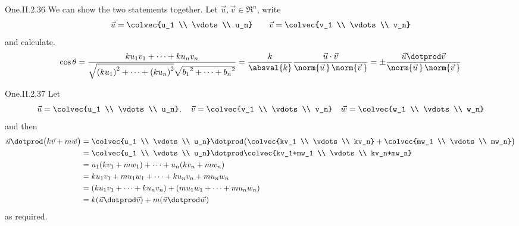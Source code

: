 \begin{ans}{One.II.2.36}
      We can show the two statements together.
      Let \( \vec{u}, \vec{v}\in\Re^n \), write
      \begin{equation*}
         \vec{u}=\colvec{u_1 \\ \vdots \\ u_n}
         \qquad
         \vec{v}=\colvec{v_1 \\ \vdots \\ v_n}
      \end{equation*}
      and calculate.
      \begin{equation*}
        \cos\theta=
        \frac{ku_1v_1+\cdots+ku_nv_n}{
             \sqrt{{(ku_1)}^2+\cdots+{(ku_n)}^2}\sqrt{{b_1}^2+\cdots+{b_n}^2} }
        =\frac{k}{\absval{k}}
        \frac{\vec{u}\cdot\vec{v}}{\norm{\vec{u}\,}\,\norm{\vec{v}\,} }
        =\pm
        \frac{\vec{u}\dotprod\vec{v}}{\norm{\vec{u}\,}\,\norm{\vec{v}\,} }
      \end{equation*}
    
\end{ans}
\begin{ans}{One.II.2.37}
      Let
      \begin{equation*}
        \vec{u}=\colvec{u_1 \\ \vdots \\ u_n},
        \quad
        \vec{v}=\colvec{v_1 \\ \vdots \\ v_n}
        \quad
        \vec{w}=\colvec{w_1 \\ \vdots \\ w_n}
      \end{equation*}
      and then
      \begin{align*}
        \vec{u}\dotprod\bigl(k\vec{v}+m\vec{w}\bigr)
        &=\colvec{u_1 \\ \vdots \\ u_n}\dotprod
         \bigl( \colvec{kv_1 \\ \vdots \\ kv_n}
               +\colvec{mw_1 \\ \vdots \\ mw_n} \bigr)   \\
        &=\colvec{u_1 \\ \vdots \\ u_n}\dotprod
         \colvec{kv_1+mw_1 \\ \vdots \\ kv_n+mw_n}    \\
        &=u_1(kv_1+mw_1)+\cdots+u_n(kv_n+mw_n)    \\
        &=ku_1v_1+mu_1w_1+\cdots+ku_nv_n+mu_nw_n    \\
        &=(ku_1v_1+\cdots+ku_nv_n)+(mu_1w_1+\cdots+mu_nw_n)    \\
        &=k(\vec{u}\dotprod\vec{v})+m(\vec{u}\dotprod\vec{w})
      \end{align*}
      as required.
    
\end{ans}
